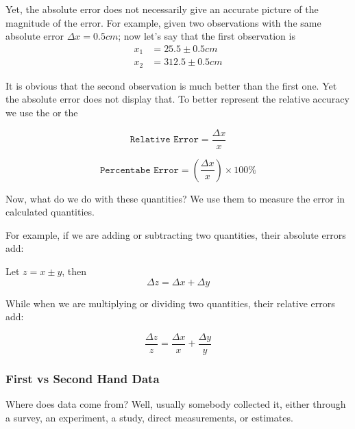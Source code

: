 Yet, the absolute error does not necessarily give an accurate picture of the magnitude of the error. For example, given two observations with the same absolute error \(\Delta x= 0.5cm\); now let's say that the first observation is 
\begin{equation}
    \begin{aligned}
    x_1 &= 25.5 \pm 0.5cm
    \\
    x_2 &= 312.5 \pm 0.5cm
    \end{aligned}
\end{equation}

 
\newpage
It is obvious that the second observation is much better than the first one. Yet the absolute error does not display that. To better represent the relative accuracy we use the  or the 


\begin{equation}
    \texttt{Relative Error} = \frac{\Delta x}{x}
\end{equation}

\begin{equation}
    \texttt{Percentabe Error} = \left(\frac{\Delta x}{x}\right)\times 100\%
\end{equation}

Now, what do we do with these quantities? We use them to measure the error in calculated quantities.

For example, if we are adding or subtracting two quantities, their absolute errors add:

Let \(z = x \pm y\), then 
\begin{equation}
    \Delta z = \Delta x + \Delta y
    \label{eq:error_addition}
\end{equation}

While when we are multiplying or dividing two quantities, their relative errors add:

\begin{equation}
    \frac{\Delta z}{z} = \frac{\Delta x}{x} + \frac{\Delta y}{y}
    \label{eq:error_product}
\end{equation}
\vspace{1cm}

\subsubsection{First vs Second Hand Data}
Where does data come from? Well, usually somebody collected it, either through a survey, an experiment, a study, direct measurements, or estimates.
\\

